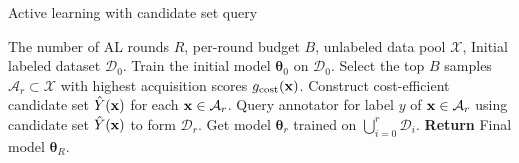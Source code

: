 \begin{algorithm}[t!]
\fontsize{9}{10}\selectfont
\caption{Active learning with candidate set query}
\label{algo:overall}
    
\begin{algorithmic}[1]
    \REQUIRE The number of AL rounds $R$,
    per-round budget $B$,
    unlabeled data pool $\mathcal{X}$,
    Initial labeled dataset $\mathcal{D}_{0}$.
    \STATE Train the initial model $\boldsymbol{\theta}_{0}$ on $\mathcal{D}_{0}$.
        \STATE Select the top $B$ samples $\mathcal{A}_{r} \subset \mathcal{X}$ with highest acquisition scores $g_\text{cost}(\mathbf{x})$.
        \STATE Construct cost-efficient candidate set $\hat{Y}(\mathbf{x})$ for each $\mathbf{x} \in \mathcal{A}_{r}$.
        \STATE Query annotator for label $y$ of $\mathbf{x} \in \mathcal{A}_{r}$ using candidate set $\hat{Y}(\mathbf{x})$ to form $\mathcal{D}_{r}$.
        \STATE Get model $\boldsymbol{\theta}_{r}$ trained on $\bigcup_{i=0}^{r}\mathcal{D}_{i}$.
    \ENDFOR
    \STATE \textbf{Return} Final model $\boldsymbol{\theta}_{R}$.
\end{algorithmic}
\end{algorithm}
